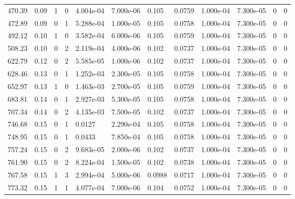 \documentclass[preview]{standalone}
\begin{document}
{{\begin{tabular}{L{1.2cm}C{1.2cm} C{0.3cm}C{0.5cm} C{1.4cm}C{1.4cm} C{1.4cm}C{1.4cm} C{1.6cm}C{1.6cm} C{1.6cm}C{1.6cm}}
  470.39  &  0.09  & 1     &  0 &  4.004e-04  & 7.000e-06  &  0.105&   0.0759& 1.000e-04 & 7.300e-05   &  0 & 0  \\ 
  472.89  &  0.09  & 0     &  1 &  5.288e-04  & 1.000e-05  &  0.105&   0.0758& 1.000e-04 & 7.300e-05   &  0 & 0  \\ 
  492.12  &  0.10  & 1     &  0 &  3.582e-04  & 6.000e-06  &  0.105&   0.0759& 1.000e-04 & 7.300e-05   &  0 & 0  \\ 
  508.23  &  0.10  & 0     &  2 &  2.119e-04  & 4.000e-06  &  0.102&   0.0737& 1.000e-04 & 7.300e-05   &  0 & 0  \\ 
  622.79  &  0.12  & 0     &  2 &  5.585e-05  & 1.000e-06  &  0.102&   0.0737& 1.000e-04 & 7.300e-05   &  0 & 0  \\ 
  628.46  &  0.13  & 0     &  1 &  1.252e-03  & 2.300e-05  &  0.105&   0.0758& 1.000e-04 & 7.300e-05   &  0 & 0  \\ 
  652.97  &  0.13  & 1     &  0 &  1.463e-03  & 2.700e-05  &  0.105&   0.0759& 1.000e-04 & 7.300e-05   &  0 & 0  \\ 
  683.81  &  0.14  & 0     &  1 &  2.927e-03  & 5.300e-05  &  0.105&   0.0758& 1.000e-04 & 7.300e-05   &  0 & 0  \\ 
  707.34  &  0.14  & 0     &  2 &  4.135e-03  & 7.500e-05  &  0.102&   0.0737& 1.000e-04 & 7.300e-05   &  0 & 0  \\ 
  746.68  &  0.15  & 0     &  1 &  0.0127  & 2.290e-04  &  0.105&   0.0758& 1.000e-04 & 7.300e-05   &  0 & 0  \\ 
  748.95  &  0.15  & 0     &  1 &  0.0433  & 7.850e-04  &  0.105&   0.0758& 1.000e-04 & 7.300e-05   &  0 & 0  \\ 
  757.24  &  0.15  & 0     &  2 &  9.683e-05  & 2.000e-06  &  0.102&   0.0737& 1.000e-04 & 7.300e-05   &  0 & 0  \\ 
  761.90  &  0.15  & 0     &  2 &  8.224e-04  & 1.500e-05  &  0.102&   0.0738& 1.000e-04 & 7.300e-05   &  0 & 0  \\ 
  767.58  &  0.15  & 1     &  3 &  2.994e-04  & 5.000e-06  &  0.0988&   0.0717& 1.000e-04 & 7.300e-05   &  0 & 0  \\ 
  773.32  &  0.15  & 1     &  1 &  4.077e-04  & 7.000e-06  &  0.104&   0.0752& 1.000e-04 & 7.300e-05   &  0 & 0  \\ 
\hline 
\end{tabular} 

}}
\end{document}
